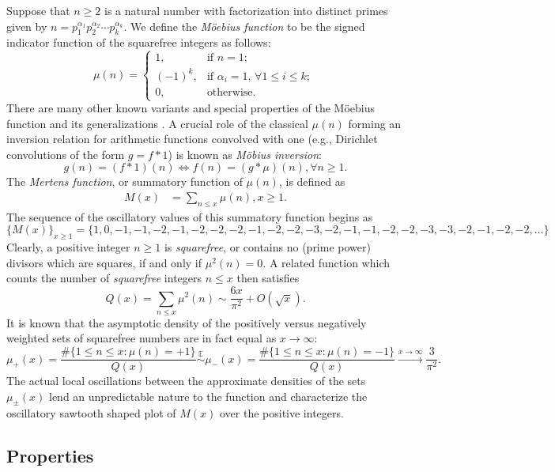 \documentclass[11pt,reqno,a4letter]{article}
\numberwithin{figure}{section}
\numberwithin{table}{section}
\newcommand{\cf}{\textit{cf.\ }}
\newcommand{\seqnum}[1]{\href{http://oeis.org/#1}{\color{ProcessBlue}{\underline{#1}}}}
\theoremstyle{plain}
\numberwithin{theorem}{section}
\theoremstyle{definition}
\begin{document}
Suppose that $n \geq 2$ is a natural number with factorization into 
distinct primes given by 
$n = p_1^{\alpha_1} p_2^{\alpha_2} \cdots p_k^{\alpha_k}$. 
We define the \emph{M\"oebius function} to be the signed indicator function 
of the squarefree integers as follows: 
\[
\mu(n) = \begin{cases} 
     1, & \text{if $n = 1$; } \\ 
     (-1)^k, & \text{if $\alpha_i = 1$, $\forall 1 \leq i \leq k$; } \\ 
     0, & \text{otherwise.} 
     \end{cases} 
\]
There are many other known variants and special properties of the M\"oebius function 
and its generalizations \cite[\cf \S 2]{HANDBOOKNT-2004}. 
A crucial role of the classical $\mu(n)$ forming an inversion relation 
for arithmetic functions convolved with one (e.g., Dirichlet convolutions of the form $g = f \ast 1$) is 
known as \emph{M\"obius inversion}: 
\[
g(n) = (f \ast 1)(n) \iff f(n) = (g \ast \mu)(n), \forall n \geq 1. 
\]
The \emph{Mertens function}, or summatory function of $\mu(n)$, is defined as 
\begin{align*} 
M(x) & = \sum_{n \leq x} \mu(n), x \geq 1. 
\end{align*} 
The sequence of the oscillatory values of this summatory function begins as 
\cite[\seqnum{A002321}]{OEIS} 
\[
\{M(x)\}_{x \geq 1} = \{1, 0, -1, -1, -2, -1, -2, -2, -2, -1, -2, -2, -3, -2, 
     -1, -1, -2, -2, -3, -3, -2, -1, -2, -2, \ldots\}
\]
Clearly, a positive integer $n \geq 1$ is \emph{squarefree}, or contains no (prime power) divisors which are 
squares, if and only if $\mu^2(n) = 0$. 
A related function which counts the 
number of \emph{squarefree} integers $n \leq x$ then satisfies 
\cite[\S 18.6]{HARDYWRIGHT} \cite[\seqnum{A013928}]{OEIS} 
\[ 
Q(x) = \sum_{n \leq x} \mu^2(n) \sim \frac{6x}{\pi^2} + O\left(\sqrt{x}\right). 
\] 
It is known that the asymptotic density of the positively versus negatively 
weighted sets of squarefree numbers are in fact equal as $x \rightarrow \infty$: 
\[
\mu_{+}(x) = \frac{\#\{1 \leq n \leq x: \mu(n) = +1\}}{Q(x)} \overset{\mathbb{E}}{\sim} 
     \mu_{-}(x) = \frac{\#\{1 \leq n \leq x: \mu(n) = -1\}}{Q(x)} 
     \xrightarrow{x \rightarrow \infty} \frac{3}{\pi^2}. 
\]
The actual local oscillations between the approximate densities of the sets 
$\mu_{\pm}(x)$ lend an unpredictable nature to the function and characterize the 
oscillatory sawtooth shaped plot of $M(x)$ over the positive integers. 

\subsection{Properties} 
\end{document}
